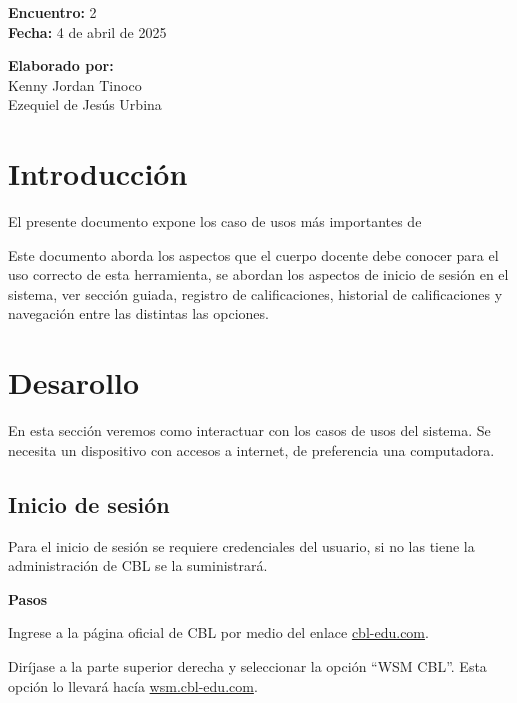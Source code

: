 \documentclass[12pt]{article}
\begin{document}
    \begin{multicols}{2}
        \textbf{Encuentro:} 2\\
        \textbf{Fecha:} 4 de abril de 2025\\
        \begin{flushright}
            \textbf{Elaborado por:}\\
            Kenny Jordan Tinoco\\
            Ezequiel de Jesús Urbina
        \end{flushright}
    \end{multicols}

    \tableofcontents
    \thispagestyle{fancy}

    \section{Introducción}

    El presente documento expone los caso de usos más importantes de \wsm

    Este documento aborda los aspectos que el cuerpo docente debe conocer para el uso correcto de
    esta herramienta, se abordan los aspectos de inicio de sesión en el sistema, ver sección guiada, registro de
    calificaciones, historial de calificaciones y navegación entre las distintas las opciones.

    \section{Desarollo}

    En esta sección veremos como interactuar con los casos de usos del sistema.
    Se necesita un dispositivo con accesos a internet, de preferencia una computadora.

    \newpage
    \subsection{Inicio de sesión}

    Para el inicio de sesión se requiere credenciales del usuario, si no las tiene la administración de CBL se la suministrará.

    \textbf{\large Pasos}\par

     Ingrese a la página oficial de CBL por medio del enlace \href{www.cbl-edu.com}{cbl-edu.com}.

     Diríjase a la parte superior derecha y seleccionar la opción ``WSM CBL''.
    Esta opción lo llevará hacía \href{wsm.cbl-edu.com}{wsm.cbl-edu.com}.
\end{document}
